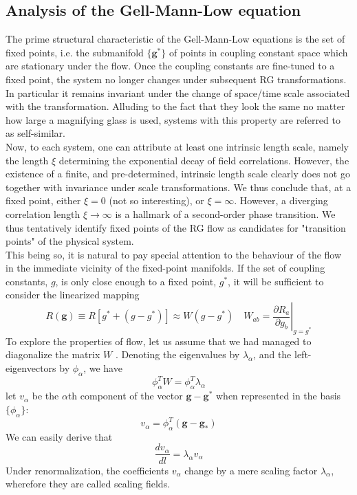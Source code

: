 \subsection{Analysis of the Gell-Mann-Low equation}
The prime structural characteristic of the Gell-Mann-Low equations is the set of fixed points, i.e. the submanifold $\{\bm{g}^*\}$ of points in coupling constant space which are stationary under the flow. 
Once the coupling constants are fine-tuned to a fixed point, the system no longer changes under subsequent RG transformations. In particular it remains invariant under the change of space/time scale associated with the transformation.
Alluding to the fact that they look the same no matter how large a magnifying glass is used, systems with this property are referred to as self-similar.
\\
Now, to each system, one can attribute at least one intrinsic length scale, namely the length $\xi$ determining the exponential decay of field correlations. 
However, the existence of a finite, and pre-determined, intrinsic length scale clearly does not go together with invariance under scale transformations. We thus conclude that, at a fixed point, either $\xi = 0$ (not so interesting), or $\xi = \infty$. 
However, a diverging correlation length $\xi \to \infty$ is a hallmark of a second-order phase transition. We thus tentatively identify fixed points of the RG flow as candidates for "transition points" of the physical system.
\\
This being so, it is natural to pay special attention to
the behaviour of the flow in the immediate vicinity of the fixed-point manifolds. If the set of coupling constants, $g$, is only close enough to a fixed point, $g^*$, it will be sufficient to consider the linearized mapping
\[R(\bm{g}) \equiv R[g^*+(g-g^*)] \approx W(g-g^*) \quad W_{ab} = \left. \frac{\partial R_a}{\partial g_b} \right|_{g=g^*}\]
To explore the properties of flow, let us assume that we had managed to diagonalize the matrix $W$ . Denoting the eigenvalues by $\lambda_{\alpha}$, and the left-eigenvectors by $\phi_{\alpha}$, we have
\[\phi_{\alpha}^T W = \phi_{\alpha}^T\lambda_{\alpha}\]
let $v_{\alpha}$ be the $\alpha$th component of the vector $\bm{g} - \bm{g}^*$ when represented in the basis $\{\phi_{\alpha}\}$:
\[v_{\alpha} = \phi_{\alpha}^T (\bm{g}-\bm{g}_{*})\]
We can easily derive that
\[\frac{dv_{\alpha}}{dl} = \lambda_{\alpha}v_{\alpha}\]
Under renormalization, the coefficients $v_{\alpha}$ change by a mere scaling factor $\lambda_{\alpha}$, wherefore they are called scaling fields.
